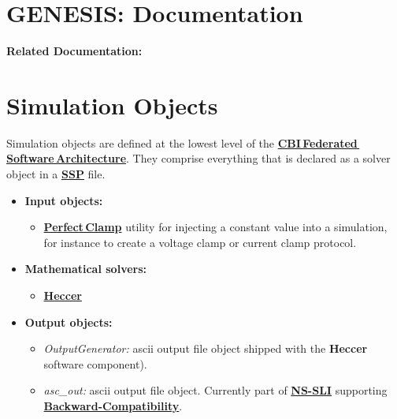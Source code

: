\documentclass[12pt]{article}
\begin{document}
\section*{GENESIS: Documentation}

{\bf Related Documentation:}

\section*{Simulation Objects}

Simulation objects are defined at the lowest level of the
\href{../genesis-overview/genesis-overview.tex}{\bf
  CBI\,Federated\,Software\,Architecture}.  They comprise everything
that is declared as a solver object in a \href{../ssp/ssp.tex}{\bf
  SSP} file.

\begin{itemize}

\item {\bf Input objects:}
   \begin{itemize}
   \item \href{../pclamp/pclamp.tex}{\bf Perfect\,Clamp} utility for
     injecting a constant value into a simulation, for instance to
     create a voltage clamp or current clamp protocol.
   \end{itemize}
   
\item{\bf Mathematical solvers:}
   \begin{itemize}
      \item \href{../heccer/heccer.tex}{\bf Heccer}
   \end{itemize}
   
\item {\bf Output objects:}
   \begin{itemize}
   \item {\it OutputGenerator:} ascii output file object shipped with
     the {\bf Heccer} software component).
   \item {\it asc\_out:} ascii output file object.  Currently part of
     \href{../nssli/nssli.tex}{\bf NS-SLI} supporting
     \href{../backward-compatibility/backward-compatibility.tex}{\bf
       Backward-Compatibility}.
   \end{itemize}

\end{itemize}
\end{document}
